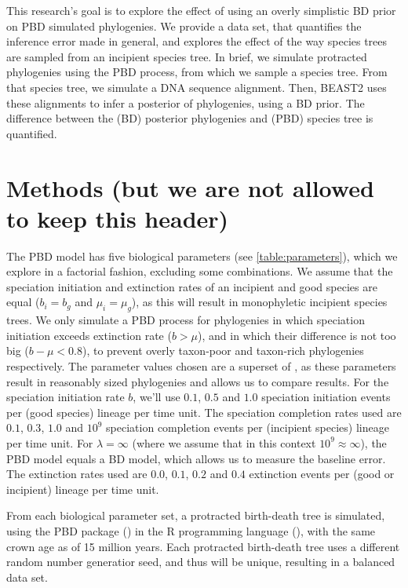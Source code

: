 \documentclass{article}
\begin{document}
This research's goal is to explore the effect of using an overly simplistic
BD prior on PBD simulated phylogenies. We provide a data set, 
that quantifies the inference error made in general, and explores
the effect of the way species trees are sampled from an incipient species tree.  
In brief, we simulate protracted phylogenies using the PBD process,
from which we sample a species tree. From that species tree, 
we simulate a DNA sequence alignment. Then, BEAST2 uses these alignments
to infer a posterior of phylogenies, using a BD prior. The difference
between the (BD) posterior phylogenies and (PBD) species tree is quantified.

\section{Methods (but we are not allowed to keep this header)}

The PBD model has five biological parameters (see \ref{table:parameters}), 
which we explore in a factorial fashion, excluding some combinations. 
We assume that the speciation initiation and extinction rates
of an incipient and good species are equal ($b_i = b_g$ and $\mu_i = \mu_g$),
as this will result in monophyletic incipient species trees.
We only simulate a PBD process for phylogenies in which
speciation initiation exceeds extinction rate ($b > \mu$),
and in which their difference is not too big ($b - \mu < 0.8$), 
to prevent overly taxon-poor and taxon-rich phylogenies respectively.
The parameter values chosen are a 
superset of \cite{etienne2014}, as these parameters result in reasonably
sized phylogenies and allows us to compare results. 
For the speciation initiation rate $b$, we'll use $0.1$, $0.5$ and $1.0$ 
speciation initiation events per (good species) lineage per time unit.
The speciation completion rates used are $0.1$, $0.3$, $1.0$ and $10^9$ speciation completion
events per (incipient species) lineage per time unit. For 
$\lambda = \infty$ (where we assume that in this context $10^9 \approx \infty$), 
the PBD model equals a BD model, which allows us to measure the baseline error.
The extinction rates used are $0.0$, $0.1$, $0.2$ and $0.4$ 
extinction events per (good or incipient) lineage per time unit.

From each biological parameter set, a protracted birth-death tree is simulated,
using the PBD package (\cite{pbd}) in the R programming language (\cite{r}), 
with the same crown age as \cite{etienne2014} of 15 million years. 
Each protracted birth-death tree uses a different random number
generatior seed, and thus will be unique, resulting in a balanced 
data set. 
\end{document}

